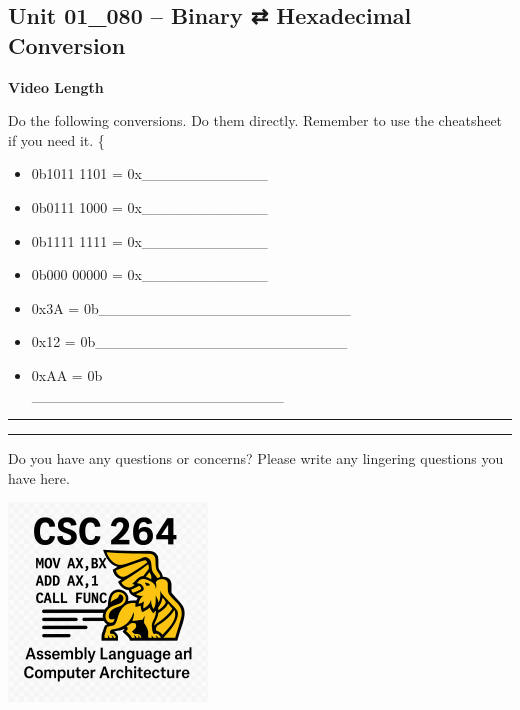 \documentclass[letterpaper,12pt]{exam}
\newcommand{\unit}{Unit 01}
\begin{document}
\begin{questions}
\section*{\unit\_080 -- Binary ⇄ Hexadecimal Conversion}
\par{\selectfont\textbf{Video Length }}
\begin{samepage}
    \question Do the following conversions.  Do them directly.  Remember to use the cheatsheet if you need it.
    \{\begin{itemize}
      \item  0b1011 1101 = 0x\_\_\_\_\_\_\_\_\_\_\_\_\\
      \item  0b0111 1000 = 0x\_\_\_\_\_\_\_\_\_\_\_\_\\
      \item  0b1111 1111 = 0x\_\_\_\_\_\_\_\_\_\_\_\_\\
      \item  0b000 00000 = 0x\_\_\_\_\_\_\_\_\_\_\_\_
      \item  0x3A = 0b\_\_\_\_\_\_\_\_\_\_\_\_\_\_\_\_\_\_\_\_\_\_\_\_\\
      \item  0x12 = 0b\_\_\_\_\_\_\_\_\_\_\_\_\_\_\_\_\_\_\_\_\_\_\_\_\\
      \item  0xAA = 0b\\_\_\_\_\_\_\_\_\_\_\_\_\_\_\_\_\_\_\_\_\_\_\_\_\\
    \end{itemize}
\end{samepage}

\rule{0.5\textwidth}{.4pt} %
\begin{center}
    \rule{0.5\textwidth}{.4pt}
\end{center}
Do you have any questions or concerns? Please write any lingering questions you have here.

\end{questions}
\vfill
\begin{center}
\includegraphics{../csc264Logo}
\end{center}
\end{document}
